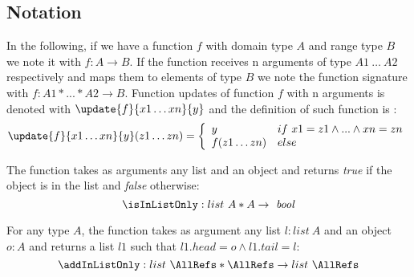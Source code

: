 
 \subsection{Notation}\label{notation}
 In the following, if we have a function $f$ with  domain type  $A$ and range type $B$
 we note it with $f : A \rightarrow B$. If the function receives n arguments of type $A1 \ \ldots \ A2$ respectively
 and maps them to elements of type $B$
 we note the function signature with $f : A1 * ...*A2 \rightarrow B$.   
 Function updates of function $f$ with n arguments is denoted with $ \update{f}{x1 \ldots xn}{y} $ and the definition of such function is :
 $$  \update{f}{x1 \ldots xn }{y}(z1 \ldots zn) = 
    \left\{\begin{array}{ll}
                  y & if \ x1 = z1 \wedge ...\wedge xn = zn \\
		  f(z1 \ldots zn ) & else
           \end{array}\right.$$
 
 The function \isInListOnly  takes as arguments any list and an object and  returns \textit{true} if the object is in the 
 list and \textit{false} otherwise:
 $$ \isInListOnly : list \ A * A \rightarrow \mbox{ \rm \textit{bool}}$$
 

 For any type $A$, the function \addInListOnly takes as argument any list $l: list \ A$ and an object 
$o: A$ and returns a list $l1 $ such that $l1.head = o \wedge l1.tail = l$: 
 $$
  \addInListOnly : list \ \AllRefs * \AllRefs \rightarrow  list \ \AllRefs 
 $$
